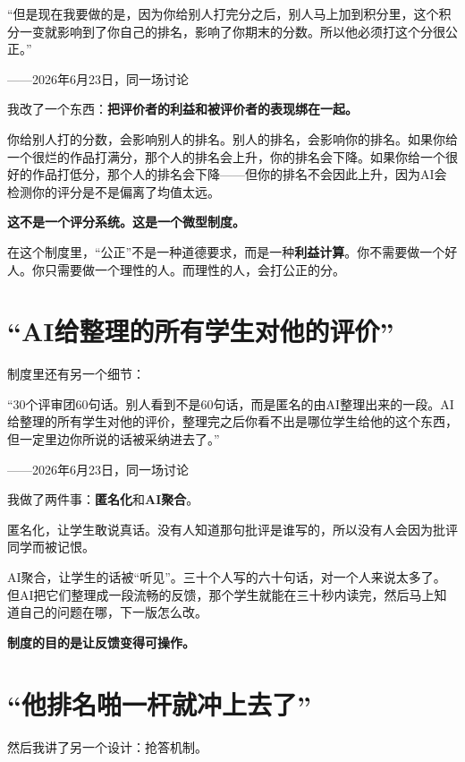 \begin{shiyu-inline}
``但是现在我要做的是，因为你给别人打完分之后，别人马上加到积分里，这个积分一变就影响到了你自己的排名，影响了你期末的分数。所以他必须打这个分很公正。''

\hfill ——2026年6月23日，同一场讨论
\end{shiyu-inline}

我改了一个东西：\textbf{把评价者的利益和被评价者的表现绑在一起。}

你给别人打的分数，会影响别人的排名。别人的排名，会影响你的排名。如果你给一个很烂的作品打满分，那个人的排名会上升，你的排名会下降。如果你给一个很好的作品打低分，那个人的排名会下降——但你的排名不会因此上升，因为AI会检测你的评分是不是偏离了均值太远。

\textbf{这不是一个评分系统。这是一个微型制度。}

在这个制度里，``公正''不是一种道德要求，而是一种\textbf{利益计算}。你不需要做一个好人。你只需要做一个理性的人。而理性的人，会打公正的分。

\section{``AI给整理的所有学生对他的评价''}

制度里还有另一个细节：

\begin{shiyu-inline}
``30个评审团60句话。别人看到不是60句话，而是匿名的由AI整理出来的一段。AI给整理的所有学生对他的评价，整理完之后你看不出是哪位学生给他的这个东西，但一定里边你所说的话被采纳进去了。''

\hfill ——2026年6月23日，同一场讨论
\end{shiyu-inline}

我做了两件事：\textbf{匿名化}和\textbf{AI聚合}。

匿名化，让学生敢说真话。没有人知道那句批评是谁写的，所以没有人会因为批评同学而被记恨。

AI聚合，让学生的话被``听见''。三十个人写的六十句话，对一个人来说太多了。但AI把它们整理成一段流畅的反馈，那个学生就能在三十秒内读完，然后马上知道自己的问题在哪，下一版怎么改。

\textbf{制度的目的是让反馈变得可操作。}

\section{``他排名啪一杆就冲上去了''}

然后我讲了另一个设计：抢答机制。

